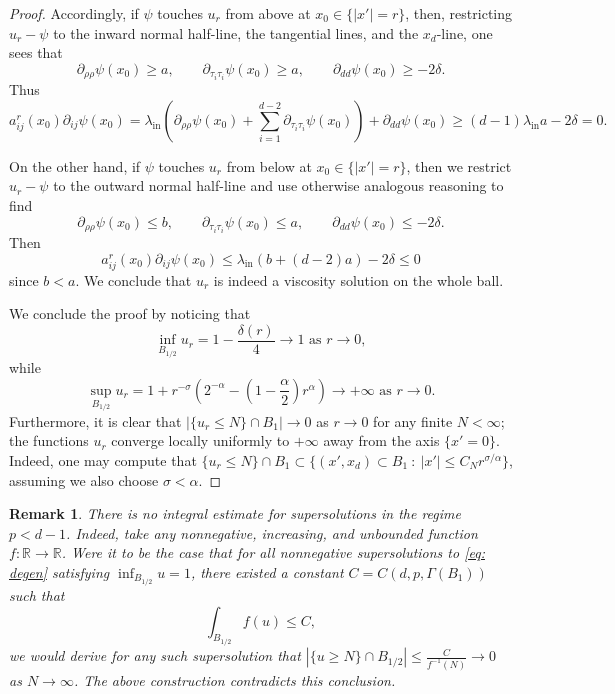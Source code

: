 \documentclass[reqno]{amsart}
\numberwithin{equation}{section}
\newtheorem{preremark}[thm]{Remark}
\newenvironment{remark}{\begin{preremark}\rm}{\medskip \end{preremark}}
\numberwithin{equation}{section}
\newcommand{\R}{\mathbb R}
\newcommand{\ds}{\displaystyle}
\newcounter{case}
\begin{document}
\begin{proof}
Accordingly, if $\psi$ touches $u_r$ from above at $x_0 \in \{|x'|=r\}$, then, restricting $u_r - \psi$ to the inward normal half-line, the tangential lines, and the $x_d$-line, one sees that
$$\partial_{\rho\rho}\psi(x_0) \ge a, \qquad \partial_{\tau_i\tau_i} \psi(x_0) \ge a, \qquad \partial_{dd} \psi(x_0) \ge - 2\delta.$$
Thus
$$a_{ij}^r(x_0)\partial_{ij}\psi(x_0) = \lambda_{\text{in}}\left(\partial_{\rho \rho}\psi(x_0) + \sum_{i=1}^{d-2} \partial_{\tau_i\tau_i}\psi(x_0)\right) + \partial_{dd}\psi(x_0) \ge (d-1)\lambda_{\text{in}}a - 2\delta =0.$$

On the other hand, if $\psi$ touches $u_r$ from below at $x_0 \in \{|x'|=r\}$, then we restrict $u_r -\psi$ to the outward normal half-line and use otherwise analogous reasoning to find 
$$\partial_{\rho\rho}\psi(x_0) \le b, \qquad \partial_{\tau_i\tau_i} \psi(x_0) \le a, \qquad \partial_{dd} \psi(x_0) \le - 2\delta.$$
Then
$$a_{ij}^r(x_0) \partial_{ij}\psi(x_0) \le \lambda_{\text{in}}(b+ (d-2)a) -2\delta \le 0$$
since $b<a$. We conclude that $u_r$ is indeed a viscosity solution on the whole ball.


We conclude the proof by noticing that
$$\inf_{B_{1/2}} u_r = 1- \frac{\delta(r)}{4} \to 1 \text{ as } r\to 0,$$
while
$$\sup_{B_{1/2}}u_r = 1 + r^{-\sigma}\left(2^{-\alpha} -\left(1-\frac\alpha2\right)r^\alpha\right) \to +\infty \text{ as } r\to 0.$$
Furthermore, it is clear that $|\{u_r \le N\} \cap B_1|\to 0$ as $r\to 0$ for any finite $N<\infty$; the functions $u_r$ converge locally uniformly to $+\infty$ away from the axis $\{x'=0\}$. Indeed, one may compute that
$\{u_r \le N\} \cap B_1 \subset \{(x',x_d)\subset B_1 \ : \ |x'| \le C_N r^{\sigma/\alpha}\}$, assuming we also choose $\sigma<\alpha$. 
\end{proof} 
\begin{remark}
    There is no integral estimate for supersolutions in the regime $p<d-1$. Indeed, take any nonnegative, increasing, and unbounded function $f: \R \to \R$. Were it to be the case that for all nonnegative supersolutions to \eqref{eq: degen} satisfying $\ds \inf_{B_{1/2}} u =1$, there existed a constant $C = C(d,p, \Gamma(B_1))$ such that 
    $$\int_{B_{1/2}} f(u) \le C,$$
    we would derive for any such supersolution that $\ds | \{u \ge N\}\cap B_{1/2}| \le \frac{C}{f^{-1}(N)} \to 0$ as $N \to \infty$. The above construction contradicts this conclusion. 
\end{remark}
\end{document}
